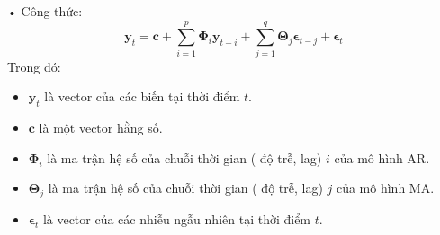 \documentclass{article}
\begin{document}
\begin{multicols}{2}
    • Công thức:
    \begin{equation}
        \mathbf{y}_t = \mathbf{c} + \sum_{i=1}^{p} \mathbf{\Phi}_i \mathbf{y}_{t-i} + \sum_{j=1}^{q} \mathbf{\Theta}_j \boldsymbol{\epsilon}_{t-j} + \boldsymbol{\epsilon}_t
    \end{equation}  
Trong đó:  
    \begin{itemize}
      \item \( \mathbf{y}_t \) là vector của các biến tại thời điểm \( t \).
      \item \( \mathbf{c} \) là một vector hằng số.
      \item \( \mathbf{\Phi}_i \) là ma trận hệ số của chuỗi thời gian ( độ trễ, lag) \( i \) của mô hình AR.
      \item \( \mathbf{\Theta}_j \) là ma trận hệ số của chuỗi thời gian ( độ trễ, lag) \( j \) của mô hình MA.
      \item \( \boldsymbol{\epsilon}_t \) là vector của các nhiễu ngẫu nhiên tại thời điểm \( t \).
    \end{itemize} 

\end{multicols}
\end{document}

